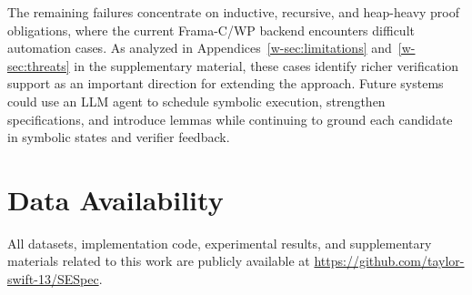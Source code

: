 \documentclass[lettersize,journal]{IEEEtran}
\newcommand{\apptworef}[2]{Appendices~\ref*{w-#1} and~\ref*{w-#2} in the supplementary material}
\begin{document}
{The remaining failures concentrate on inductive, recursive, and heap-heavy proof obligations, where the current Frama-C/WP backend encounters difficult automation cases. As analyzed in \apptworef{sec:limitations}{sec:threats}, these cases identify richer verification support as an important direction for extending the approach. Future systems could use an LLM agent to schedule symbolic execution, strengthen specifications, and introduce lemmas while continuing to ground each candidate in symbolic states and verifier feedback.}


\section*{Data Availability}
All datasets, implementation code, experimental results, and supplementary materials related to this work are publicly available at \url{https://github.com/taylor-swift-13/SESpec}.




\end{document}
